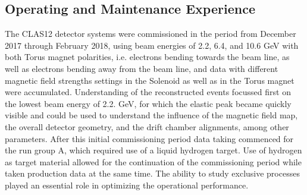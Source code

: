 \documentclass[final,3p,twocolumn]{elsarticle}
\begin{document}
\subsection{\rm Operating and Maintenance Experience}
The CLAS12 detector systems were commissioned in the period from December 2017 through February 2018, using beam energies of 2.2, 6.4, and 10.6 GeV with both Torus magnet polarities, i.e. electrons bending towards the beam line, as well as electrons bending away from the beam line, and data with different magnetic field strengths settings in the Solenoid as well as in the Torus magnet were accumulated. Understanding of the reconstructed events focussed first on the lowest beam energy of 2.2. GeV, for
which the elastic peak became quickly visible and could be used to understand the influence of the magnetic field map, the 
overall detector geometry, and the drift chamber alignments, among other parameters. After this initial commissioning period data taking commenced for the run group A, which required use of a liquid hydrogen target. Use of hydrogen as target material allowed for the continuation of the commissioning period while taken production data at the same time. The ability to study exclusive processes played an essential role in optimizing the operational performance. 
\end{document}
